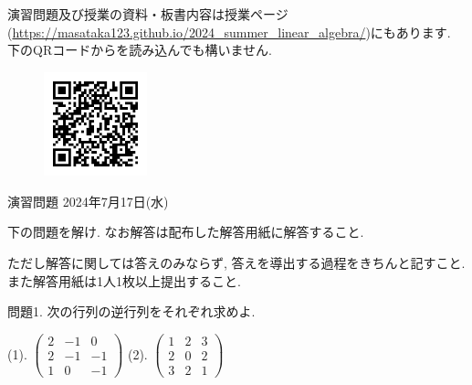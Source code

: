 \documentclass[dvipdfmx,a4paper,11pt]{article}
\theoremstyle{definition}
\begin{document}
演習問題及び授業の資料・板書内容は授業ページ(\url{https://masataka123.github.io/2024_summer_linear_algebra/})にもあります. 
下のQRコードからを読み込んでも構いません.
 \vspace{11pt}
\begin{figure}[h]
  \centering
 \includegraphics[height=30mm, width=30mm]{linalg.png}
\end{figure}




\newpage 



\begin{center}
{\Large 演習問題  2024年7月17日(水) } 
\end{center}




\begin{center}
 {\large 下の問題を解け. なお解答は配布した解答用紙に解答すること.}
  \end{center}
 ただし解答に関しては答えのみならず, 答えを導出する過程をきちんと記すこと. 
 また解答用紙は1人1枚以上提出すること.
 
  \vspace{11pt}
  問題1. 
次の行列の逆行列をそれぞれ求めよ. 
 
  \vspace{11pt}
 (1).
 $
 \begin{pmatrix}
2 &-1&0 \\
2 & -1 & -1\\
1&0&-1
 \end{pmatrix}
 $
(2). 
$
 \begin{pmatrix}
1 &2&3 \\
2 & 0 & 2\\
3&2 &1
 \end{pmatrix}
 $
\end{document}
